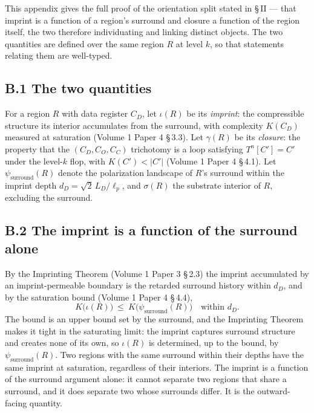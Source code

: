\documentclass[11pt,oneside]{report}
\theoremstyle{definition}
\theoremstyle{remark}
\begin{document}
This appendix gives the full proof of the orientation split stated in \S\,II
--- that imprint is a function of a region's surround and closure a function of
the region itself, the two therefore individuating and linking distinct
objects. The two quantities are defined over the same region \ensuremath{R} at
level \ensuremath{k}, so that statements relating them are well-typed.

\subsection*{B.1 The two quantities}

For a region \ensuremath{R} with data register \ensuremath{C_D}, let
\ensuremath{\iota(R)} be its \emph{imprint}: the compressible structure its
interior accumulates from the surround, with complexity \ensuremath{K(C_D)}
measured at saturation (Volume 1 Paper 4 \S\,3.3). Let \ensuremath{\gamma(R)}
be its \emph{closure}: the property that the \ensuremath{(C_D, C_O, C_C)}
trichotomy is a loop satisfying \ensuremath{T^{n}[C'] = C'} under the
level-\ensuremath{k} flop, with \ensuremath{K(C') < |C'|} (Volume 1 Paper 4
\S\,4.1). Let \ensuremath{\psi_{\mathrm{surround}}(R)} denote the polarization
landscape of \ensuremath{R}'s surround within the imprint depth
\ensuremath{d_D = \sqrt{2}\,L_D/\ell_p}, and \ensuremath{\sigma(R)} the
substrate interior of \ensuremath{R}, excluding the surround.

\subsection*{B.2 The imprint is a function of the surround alone}

By the Imprinting Theorem (Volume 1 Paper 3 \S\,2.3) the imprint accumulated by
an imprint-permeable boundary is the retarded surround history within
\ensuremath{d_D}, and by the saturation bound (Volume 1 Paper 4 \S\,4.4),
\[
K\bigl(\iota(R)\bigr)\ \le\ K\bigl(\psi_{\mathrm{surround}}(R)\bigr)
\quad\text{within } d_D.
\]
The bound is an upper bound set by the surround, and the Imprinting Theorem
makes it tight in the saturating limit: the imprint captures surround structure
and creates none of its own, so \ensuremath{\iota(R)} is determined, up to the
bound, by \ensuremath{\psi_{\mathrm{surround}}(R)}. Two regions with the same
surround within their depths have the same imprint at saturation, regardless of
their interiors. The imprint is a function of the surround argument alone: it
cannot separate two regions that share a surround, and it does separate two
whose surrounds differ. It is the outward-facing quantity.
\end{document}
